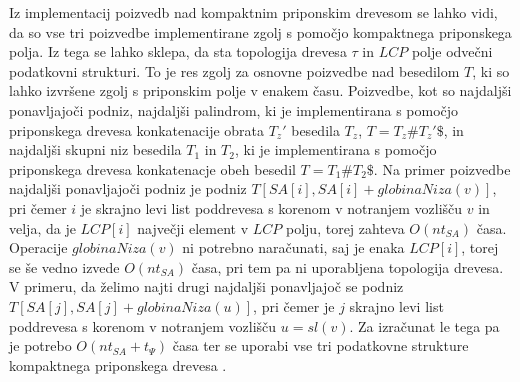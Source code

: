 Iz implementacij poizvedb nad kompaktnim priponskim drevesom se lahko vidi, da so vse tri poizvedbe implementirane zgolj s pomočjo kompaktnega priponskega polja. Iz tega se lahko sklepa, da sta topologija drevesa $\tau$ in $LCP$ polje odvečni podatkovni strukturi. To je res zgolj za osnovne poizvedbe nad besedilom $T$, ki so lahko izvršene zgolj s priponskim polje v enakem času. Poizvedbe, kot so najdaljši ponavljajoči podniz, najdaljši palindrom, ki je implementirana s pomočjo priponskega drevesa konkatenacije obrata $T_z'$ besedila $T_z$, $T=T_{z}\#T_{z}'\$$, in najdaljši skupni niz besedila $T_1$ in $T_2$, ki je implementirana s pomočjo priponskega drevesa konkatenacje obeh besedil $T=T_1 \# T_2\$ $. Na primer poizvedbe najdaljši ponavljajoči podniz je podniz $T[SA[i],SA[i]+globinaNiza(v)]$, pri čemer $i$ je skrajno levi list poddrevesa s korenom v notranjem vozlišču $v$ in velja, da je $LCP[i]$ največji element v $LCP$ polju, torej zahteva $O(nt_{SA})$ časa. Operacije $globinaNiza(v)$ ni potrebno naračunati, saj je enaka $LCP[i]$, torej se še vedno izvede $O(nt_{SA})$ časa, pri tem pa ni uporabljena topologija drevesa. V primeru, da želimo najti drugi najdaljši ponavljajoč se podniz $T[SA[j],SA[j]+globinaNiza(u)]$, pri čemer je $j$ skrajno levi list poddrevesa s korenom v notranjem vozlišču $u=sl(v)$. Za izračunat le tega pa je potrebo $O(nt_{SA}+t_\Psi)$ časa ter se uporabi vse tri podatkovne strukture kompaktnega priponskega drevesa \cite{Valimaki2007, Weiner1973, Navarro2016}.